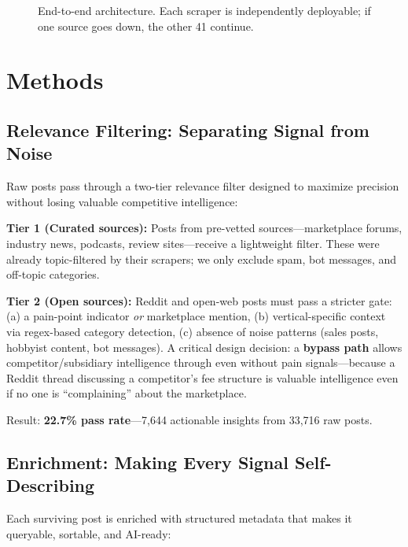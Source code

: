 \documentclass[11pt]{article}
\begin{document}
\begin{figure}[h]
\centering
{}
\caption{End-to-end architecture. Each scraper is independently deployable; if one source goes down, the other 41 continue.}
\label{fig:arch}
\end{figure}

\section{Methods}

\subsection{Relevance Filtering: Separating Signal from Noise}
Raw posts pass through a two-tier relevance filter designed to maximize precision without losing valuable competitive intelligence:

\textbf{Tier 1 (Curated sources):} Posts from pre-vetted sources---marketplace forums, industry news, podcasts, review sites---receive a lightweight filter. These were already topic-filtered by their scrapers; we only exclude spam, bot messages, and off-topic categories.

\textbf{Tier 2 (Open sources):} Reddit and open-web posts must pass a stricter gate: (a) a pain-point indicator \textit{or} marketplace mention, (b) vertical-specific context via regex-based category detection, (c) absence of noise patterns (sales posts, hobbyist content, bot messages). A critical design decision: a \textbf{bypass path} allows competitor/subsidiary intelligence through even without pain signals---because a Reddit thread discussing a competitor's fee structure is valuable intelligence even if no one is ``complaining'' about the marketplace.

Result: \textbf{22.7\% pass rate}---7,644 actionable insights from 33,716 raw posts.

\subsection{Enrichment: Making Every Signal Self-Describing}
Each surviving post is enriched with structured metadata that makes it queryable, sortable, and AI-ready:
\end{document}
